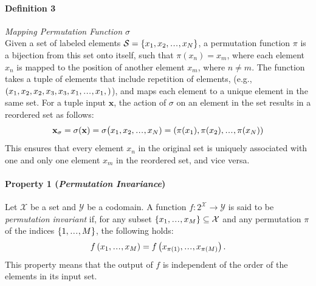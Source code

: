 \documentclass{article}
\newcommand{\perminv}{\emph{Permutation Invariance}}
\newcommand\sdots{\makebox[1em][c]{.\hfil.\hfil.}}
\begin{document}
\paragraph{Definition 3} \emph{Mapping Permutation Function \(\sigma\)}\\
Given a set of labeled elements \( \mathcal{S} = \{x_1, x_2, \sdots, x_N\} \), a permutation function \(\pi\) is a bijection from this set onto itself, such that \(\pi(x_n) = x_m\),
where each element \( x_n \) is mapped to the position of another element \( x_m \), where $n \neq m$.
The function takes a tuple of elements that include repetition of elements,
(e.g., $(x_1, x_2, x_2,x_3, x_3,x_1,\sdots,x_1,)$),
and maps each element to a unique element in the same set.
For a tuple input $\mathbf{x}$, the action of \(\sigma\) on an element in the set results in a reordered set as follows:
\begin{align}
  \mathbf{x_{\sigma}} = \sigma(\mathbf{x}) = \sigma\big(x_1, x_2,\sdots,x_N) = (\pi(x_1), \pi(x_2), \sdots, \pi(x_N))
\end{align}
This ensures that every element \( x_n \) in the original set is uniquely associated with one and only one element \( x_m \) in the reordered set, and vice versa.

\paragraph{Property 1 (\perminv)}
\label{par:permutation_invariance}
Let $\mathcal{X}$ be a set and $\mathcal{Y}$ be a codomain. A function $f: 2^{\mathcal{X}} \rightarrow \mathcal{Y}$ is said to be \textit{permutation invariant}
if, for any subset $\{x_1, \sdots, x_M\} \subseteq \mathcal{X}$ and any permutation $\pi$ of the indices $\{1, \sdots, M\}$, the following holds:
\begin{align}
  f\left(x_1, \sdots, x_M\right) = f\left(x_{\pi(1)}, \sdots, x_{\pi(M)}\right).
\end{align}
This property means that the output of $f$ is independent of the order of the elements in its input set.
\end{document}
